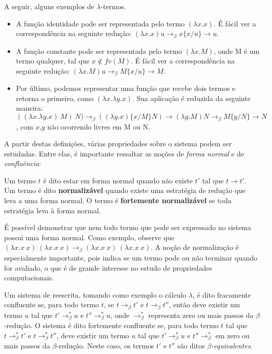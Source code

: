 A seguir, alguns exemplos de $\lambda$-termos.

\begin{itemize}
    \item A função identidade pode ser representada pelo termo $ (\lambda x. x) $.
        É fácil ver a correspondência na seguinte redução: $ (\lambda x.x) u
    \rightarrow_\beta x \{x/u\} \rightarrow u $. 
    \item A função constante pode ser representada pelo termo $ (\lambda x. M) $,
        onde M é um termo qualquer, tal que $x \notin fv(M)$.
        É fácil ver a correspondência na seguinte redução: $ (\lambda x.M) u
    \rightarrow_\beta M \{x/u\} \rightarrow M $. 
    \item Por último, podemos representar uma função que recebe dois termos e
        retorna o primeiro, como $ (\lambda x. \lambda y. x)$. Sua aplicação é
        reduzida da seguinte maneira: $ ((\lambda x. \lambda y. x)\ M)\ N)
    \rightarrow_\beta ((\lambda y. x) \{x/M\} N) \rightarrow (\lambda y. M) N
    \rightarrow_\beta M \{y/N\} \rightarrow N$, com $x$,$y$ não ocorrendo 
    livres em M ou N.
\end{itemize}



A partir destas definições, várias propriedades sobre o sistema podem ser
estudadas. Entre elas, é importante ressaltar as noções de \textit{forma
 normal} e de \textit{confluência}:

\begin{definicao}
    Um termo $t$ é dito estar em forma normal quando não existe $t'$ tal que $ t
    \rightarrow t' $.  Um termo é dito \textbf{normalizável} quando existe uma
    estratégia de redução que leva a uma forma normal. O termo é
    \textbf{fortemente normalizável} se toda estratégia leva à forma normal. 
\end{definicao}

É possível demonstrar que nem todo termo que pode ser expressado no sistema
possui uma forma normal. Como exemplo, observe que $ (\lambda x.x\ x)\ (\lambda
x.x\ x) \rightarrow_\beta (\lambda x.x\ x)\ (\lambda x.x\ x) $. A noção de
normalização é especialmente importante, pois indica se um termo pode ou não
terminar quando for avaliado, o que é de grande interesse no estudo
de propriedades computacionais.

\begin{definicao}[Confluência]
    Um sistema de reescrita, tomando como exemplo o cálculo $\lambda$, é dito
    fracamente confluente se, para todo termo $t$, se $ t \rightarrow_\beta t' $
    e $ t \rightarrow_\beta t'' $, então deve existir um termo $u$ tal que $t'
    \rightarrow_\beta^* u$ e $t'' \rightarrow_\beta^* u$, onde
    $\rightarrow_\beta^*$ representa zero ou mais passos da $\beta$-redução.  O
    sistema é dito fortemente confluente se, para todo termo $t$ tal que $ t
    \rightarrow_\beta^* t' $ e $ t \rightarrow_\beta^* t'' $, deve existir um
    termo $u$ tal que $t' \rightarrow_\beta^* u$ e $t'' \rightarrow_\beta^*$ em
    zero ou mais passos da $\beta$-redução. Neste caso, os termos $t'$ e $t''$
    são ditos \textit{$\beta$-equivalentes}.  
\end{definicao}


